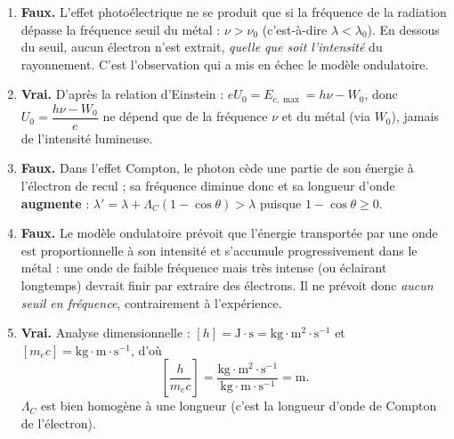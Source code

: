 \documentclass[11pt]{article}
\begin{document}
\begin{corrige}
\begin{enumerate}
\item \textbf{Faux.} L'effet photoélectrique ne se produit que si la fréquence de la radiation dépasse la fréquence seuil du métal : $\nu > \nu_0$ (c'est-à-dire $\lambda < \lambda_0$). En dessous du seuil, aucun électron n'est extrait, \emph{quelle que soit l'intensité} du rayonnement. C'est l'observation qui a mis en échec le modèle ondulatoire.
\item \textbf{Vrai.} D'après la relation d'Einstein : $eU_0 = E_{c,\max} = h\nu - W_0$, donc $U_0 = \dfrac{h\nu - W_0}{e}$ ne dépend que de la fréquence $\nu$ et du métal (via $W_0$), jamais de l'intensité lumineuse.
\item \textbf{Faux.} Dans l'effet Compton, le photon cède une partie de son énergie à l'électron de recul ; sa fréquence diminue donc et sa longueur d'onde \textbf{augmente} : $\lambda' = \lambda + \Lambda_C(1-\cos\theta) > \lambda$ puisque $1-\cos\theta \geq 0$.
\item \textbf{Faux.} Le modèle ondulatoire prévoit que l'énergie transportée par une onde est proportionnelle à son intensité et s'accumule progressivement dans le métal : une onde de faible fréquence mais très intense (ou éclairant longtemps) devrait finir par extraire des électrons. Il ne prévoit donc \emph{aucun seuil en fréquence}, contrairement à l'expérience.
\item \textbf{Vrai.} Analyse dimensionnelle : $[h] = \text{J}\cdot\text{s} = \text{kg}\cdot\text{m}^2\cdot\text{s}^{-1}$ et $[m_e c] = \text{kg}\cdot\text{m}\cdot\text{s}^{-1}$, d'où
\[ \left[\frac{h}{m_e c}\right] = \frac{\text{kg}\cdot\text{m}^2\cdot\text{s}^{-1}}{\text{kg}\cdot\text{m}\cdot\text{s}^{-1}} = \text{m}. \]
$\Lambda_C$ est bien homogène à une longueur (c'est la longueur d'onde de Compton de l'électron).
\end{enumerate}
\end{corrige}
\end{document}
